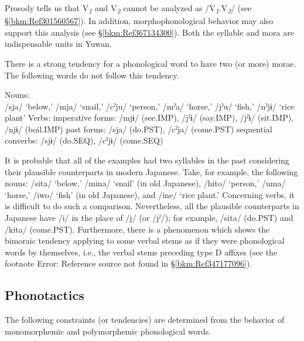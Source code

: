 Prosody tells us that V\textit{\textsubscript{1}} and V\textit{\textsubscript{2}} cannot be analyzed as /V\textit{\textsubscript{1}}.V\textit{\textsubscript{2}}/ (see §\ref{bkm:Ref301560567}). In addition, morphophonological behavior may also support this analysis (see §\ref{bkm:Ref367134300}). Both the syllable and mora are indispensable units in Yuwan.

There is a strong tendency for a phonological word to have two (or more) morae. The following words do not follow this tendency.

\ea 
\ea Nouns:\\
    /sja/ ‘below,’ /mja/\footnotemark{} ‘snail,’ /cˀju/ ‘person,’ /mˀa/ ‘horse,’ /jˀu/ ‘fish,’ /nˀjɨ/ ‘rice plant’
\ex Verbs:
\ea imperative forms: /mjɨ/ (see.IMP), /jˀɨ/ (say.IMP), /jˀɨ/ (sit.IMP), /njɨ/ (boil.IMP)
\ex past forms: /sja/ (do.PST), /cˀja/ (come.PST)
\ex sequential converbs:  /sjɨ/ (do.SEQ), /cˀjɨ/ (come.SEQ)
\z
\z
\z
{}

It is probable that all of the examples had two syllables in the past considering their plausible counterparts in modern Japanese. Take, for example, the following nouns: /sita/ ‘below,’ /mina/ ‘snail’ (in old Japanese), /hito/ ‘person,’ /uma/ ‘horse,’ /iwo/ ‘fish’ (in old Japanese), and /ine/ ‘rice plant.’ Concerning verbs, it is difficult to do such a comparison. Nevertheless, all the plausible counterparts in Japanese have /i/ in the place of /j/ (or /jˀ/); for example, /sita/ (do.PST) and /kita/ (come.PST). Furthermore, there is a phenomenon which shows the bimoraic tendency applying to some verbal stems as if they were phonological words by themselves, i.e., the verbal stems preceding type D affixes (see the footnote Error: Reference source not found in §\ref{bkm:Ref347177096}).

\subsection{Phonotactics}
\label{bkm:Ref302599510}\hypertarget{RefHeadingToc395696971}{}
The following constraints (or tendencies) are determined from the behavior of monomorphemic and polymorphemic phonological words.

